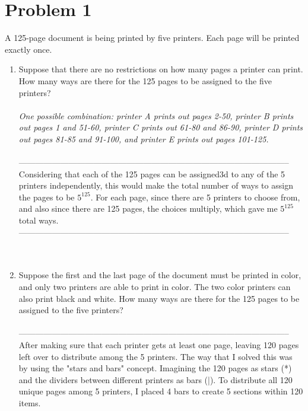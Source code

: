 \documentclass{amsart}
\theoremstyle{definition}
\theoremstyle{Exercise}
\theoremstyle{remark}
\theoremstyle{rule}
\numberwithin{equation}{section}
\begin{document}

\section*{Problem 1}

A 125-page document is being printed by five printers. Each page will be printed exactly once.
 \begin{enumerate}[label=(\alph*)]
 \item  Suppose that there are no restrictions on how many pages a printer can print. How many ways are there for the 125 pages to be assigned to the five printers?\\\\
{\it One possible combination: printer A prints out pages 2-50, printer B prints out pages 1 and 51-60, printer C prints out 61-80 and 86-90, printer D prints out pages 81-85 and 91-100, and printer E prints out pages 101-125.}\\\\
--------------------------------------------------------------------------------------------------\\
Considering that each of the 125 pages can be assigned3d to any of the 5 printers independently,  this would make the total number of ways to assign the pages to be \(5^{125}\). For each page, since there are 5 printers to choose from, and also since there are 125 pages, the choices multiply, which gave me \(5^{125}\) total ways.\\
--------------------------------------------------------------------------------------------------\\
        \\\\
 \item Suppose the first and the last page of the document must be printed in color, and only two printers are able to print in color. The two color printers can also print black and white. How many ways are there for the 125 pages to be assigned to the five printers?\\\\
--------------------------------------------------------------------------------------------------\\
After making sure that each printer gets at least one page, leaving 120 pages left over to distribute among the 5 printers. The way that I solved this was by using the "stars and bars" concept. Imagining the 120 pages as stars (*) and the dividers between different printers as bars (|). To distribute all 120 unique pages among 5 printers, I placed 4 bars to create 5 sections within 120 items.\\

\end{enumerate}
\end{document}
